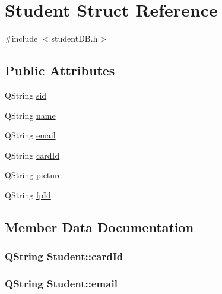 \hypertarget{struct_student}{}\section{Student Struct Reference}
\label{struct_student}


{\ttfamily \#include $<$student\+D\+B.\+h$>$}

\subsection*{Public Attributes}
\begin{DoxyCompactItemize}
\item 
Q\+String \hyperlink{struct_student_a8d3097060ba620bf83b2f308422100b7}{sid}
\item 
Q\+String \hyperlink{struct_student_a51657798a957fca44cd4dbf6de45a13b}{name}
\item 
Q\+String \hyperlink{struct_student_aec40cb12148ace79308e9c921e3210b0}{email}
\item 
Q\+String \hyperlink{struct_student_a23fe9bc1f93939fd5cdf3537f86a4fa7}{card\+Id}
\item 
Q\+String \hyperlink{struct_student_af7e475f4c1348b582ce20378524fbea3}{picture}
\item 
Q\+String \hyperlink{struct_student_a3052ca2dcf48134a6fa8b609e88b2ede}{fp\+Id}
\end{DoxyCompactItemize}


\subsection{Member Data Documentation}
\hypertarget{struct_student_a23fe9bc1f93939fd5cdf3537f86a4fa7}{}
\subsubsection[{card\+Id}]{\setlength{\rightskip}{0pt plus 5cm}Q\+String Student\+::card\+Id}\label{struct_student_a23fe9bc1f93939fd5cdf3537f86a4fa7}
\hypertarget{struct_student_aec40cb12148ace79308e9c921e3210b0}{}
\subsubsection[{email}]{\setlength{\rightskip}{0pt plus 5cm}Q\+String Student\+::email}\label{struct_student_aec40cb12148ace79308e9c921e3210b0}
\hypertarget{struct_student_a3052ca2dcf48134a6fa8b609e88b2ede}{}
